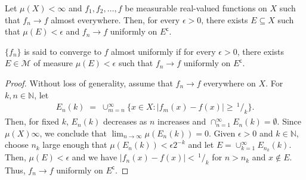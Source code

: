 \documentclass[a4paper,english,12pt]{article}
\begin{document}
\begin{thm}Let $\mu(X)<\infty$ and $f_1,f_2,\ldots,f$ be measurable real-valued functions on $X$ such that $f_n\rightarrow f$ almost everywhere. Then, for every $\epsilon>0$, there exists $E\subseteq X$ such that $\mu(E)<\epsilon$ and $f_n\rightarrow f$ uniformly on $E^{\mathsf{c}}$.
\end{thm}
\begin{rem}$\{f_n\}$ is said to converge to $f$ almost uniformly if for every $\epsilon>0$, there exists $E\in\mathcal{M}$ of measure $\mu(E)<\epsilon$ such that $f_n\rightarrow f$ uniformly on $E^{\mathsf{c}}$.
\end{rem}
\begin{proof}Without loss of generality, assume that $f_n\rightarrow f$ everywhere on $X$. For $k,n\in\mathbb{N}$, let 
	\begin{align*}
		E_n(k)\;=\; \cup_{m=n}^{\infty} \{x\in X: |f_m(x)-f(x)|\geqslant \,^1/_k\}.
	\end{align*}
Then, for fixed $k$, $E_n(k)$ decreases as $n$ increases and $\cap_{n=1}^{\infty}E_n(k)=\emptyset$. Since $\mu(X)\infty$, we conclude that $\lim_{n\rightarrow\infty}\mu(E_n(k))=0$. Given $\epsilon>0$ and $k\in\mathbb{N}$, choose $n_k$ large enough that $\mu(E_n(k))<\epsilon 2^{-k}$ and let $E=\cup_{k=1}^{\infty}E_{n_k}(k)$. Then, $\mu(E)<\epsilon$ and we have $|f_n(x)-f(x)|<\,^1/_k$ for $n>n_k$ and $x\notin E$. Thus, $f_n\rightarrow f$ uniformly on $E^{\mathsf{c}}$.
\end{proof}
\end{document}
